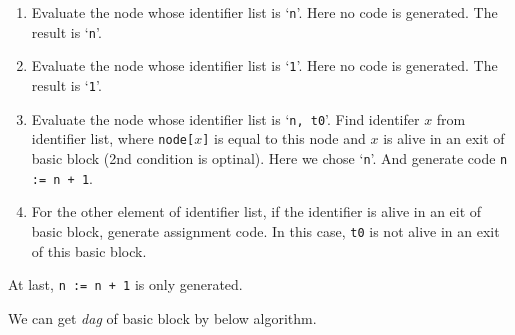 \begin{Example}
\begin{enumerate}
\item Evaluate the node whose identifier list is `{\tt{n}}'.
      Here no code is generated. The result is `{\tt{n}}'.

\item Evaluate the node whose identifier list is `{\tt{1}}'.
      Here no code is generated. The result is `{\tt{1}}'.

\item Evaluate the node whose identifier list is `{\tt{n, t0}}'.
      Find identifer $x$ from identifier list, where {\tt{node[$x$]}} is equal
      to this node and $x$ is alive in an exit of basic block
      (2nd condition is optinal). Here we chose `{\tt{n}}'.
      And generate code {\tt{n := n + 1}}.
 
\item For the other element of identifier list, if the identifier
      is alive in an eit of basic block, generate assignment code.
      In this case, {\tt{t0}} is not alive in an exit of this
      basic block.

\end{enumerate}
At last, {\tt{n := n + 1}} is only generated.
\end{Example}

We can get {\em dag} of basic block by below algorithm.

